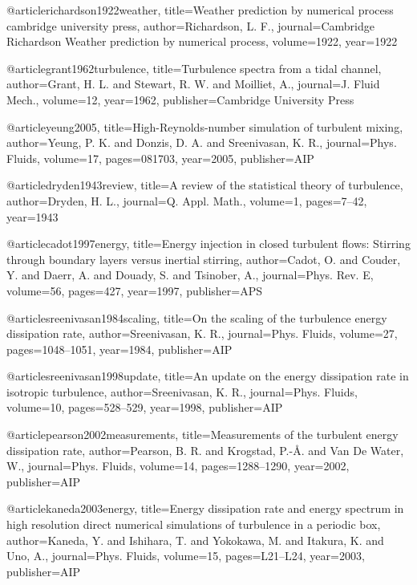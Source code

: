  @article{richardson1922weather,
    title={{Weather prediction by numerical process cambridge university press}},
    author={Richardson, L. F.},
    journal={Cambridge Richardson Weather prediction by numerical process},
    volume={1922},
    year={1922}
  }

  @article{grant1962turbulence,
    title={{Turbulence spectra from a tidal channel}},
    author={Grant, H. L. and Stewart, R. W. and Moilliet, A.},
    journal={J. Fluid Mech.},
    volume={12},
    year={1962},
    publisher={Cambridge University Press}
  }

  @article{yeung2005,
    title={{High-Reynolds-number simulation of turbulent mixing}},
    author={Yeung, P. K. and Donzis, D. A. and Sreenivasan, K. R.},
    journal={Phys. Fluids},
    volume={17},
    pages={081703},
    year={2005},
    publisher={AIP}
  }



  @article{dryden1943review,
    title={{A review of the statistical theory of turbulence}},
    author={Dryden, H. L.},
    journal={Q. Appl. Math.},
    volume={1},
    pages={7--42},
    year={1943}
  }

  @article{cadot1997energy,
    title={{Energy injection in closed turbulent flows: Stirring through boundary layers versus inertial stirring}},
    author={Cadot, O. and Couder, Y. and Daerr, A. and Douady, S. and Tsinober, A.},
    journal={Phys. Rev. E},
    volume={56},
    pages={427},
    year={1997},
    publisher={APS}
  }

  @article{sreenivasan1984scaling,
    title={{On the scaling of the turbulence energy dissipation rate}},
    author={Sreenivasan, K. R.},
    journal={Phys. Fluids},
    volume={27},
    pages={1048--1051},
    year={1984},
    publisher={AIP}
  }

  @article{sreenivasan1998update,
    title={{An update on the energy dissipation rate in isotropic turbulence}},
    author={Sreenivasan, K. R.},
    journal={Phys. Fluids},
    volume={10},
    pages={528--529},
    year={1998},
    publisher={AIP}
  }

  @article{pearson2002measurements,
    title={{Measurements of the turbulent energy dissipation rate}},
    author={Pearson, B. R. and Krogstad, P.-{\AA}. and Van De Water, W.},
    journal={Phys. Fluids},
    volume={14},
    pages={1288--1290},
    year={2002},
    publisher={AIP}
  }

  @article{kaneda2003energy,
    title={{Energy dissipation rate and energy spectrum in high resolution direct numerical simulations of turbulence in a periodic box}},
    author={Kaneda, Y. and Ishihara, T. and Yokokawa, M. and Itakura, K. and Uno, A.},
    journal={Phys. Fluids},
    volume={15},
    pages={L21--L24},
    year={2003},
    publisher={AIP}
  }

